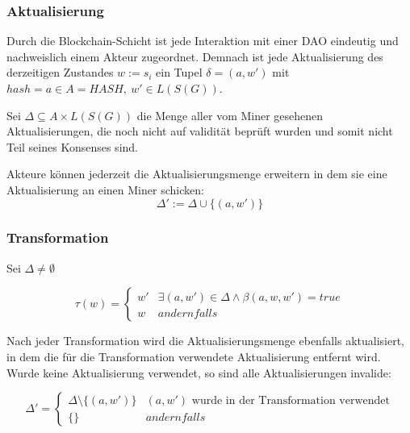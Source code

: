 \documentclass[a4paper,12pt]{report}
\begin{document}
% 
% 
% 
% 
% 

\subsubsection*{Aktualisierung}
Durch die Blockchain-Schicht ist jede Interaktion mit einer DAO eindeutig und nachweislich einem Akteur zugeordnet. Demnach ist jede Aktualisierung des derzeitigen Zustandes $w := s_i$ ein Tupel $\delta = (a,w')$ mit $hash=a\in A=HASH,\ w'\in L(S(G))$.

Sei $\Delta \subseteq A\times L(S(G))$ die Menge aller vom Miner gesehenen Aktualisierungen, die noch nicht auf validität beprüft wurden und somit nicht Teil seines Konsenses sind.


Akteure können jederzeit die Aktualisierungsmenge erweitern in dem sie eine Aktualisierung an einen Miner schicken: 
\[ \Delta' := \Delta \cup \{(a,w')\} \] 


\subsubsection*{Transformation}
Sei $\Delta \neq \emptyset$ 

\[
  \tau( w ) = 
  \begin{cases}
    w'  & \exists (a,w') \in \Delta \land \beta(a,w,w') = true \\
    w   & andernfalls 
  \end{cases}
\] 

Nach jeder Transformation wird die Aktualisierungsmenge ebenfalls aktualisiert, in dem die für die Transformation verwendete Aktualisierung entfernt wird. Wurde keine Aktualisierung verwendet, so sind alle Aktualisierungen invalide:

\[ 
  \Delta' = 
  \begin{cases}
    \Delta\setminus \{ (a, w' )\} & (a,w')\text{ wurde in der Transformation verwendet} \\
    \{\} & andernfalls
  \end{cases}
\] 
\end{document}
